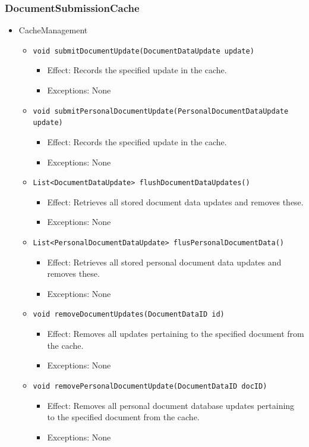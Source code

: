 \documentclass[a4paper,10pt]{article}
\begin{document}
\subsubsection*{DocumentSubmissionCache}
\begin{itemize}
	\item CacheManagement
	\begin{itemize}
		\item \texttt{void submitDocumentUpdate(DocumentDataUpdate update)}
		\begin{itemize}
			\item Effect: Records the specified update in the cache.
			\item Exceptions: None
		\end{itemize}
		
		\item \texttt{void submitPersonalDocumentUpdate(PersonalDocumentDataUpdate update)}
		\begin{itemize}
			\item Effect: Records the specified update in the cache.
			\item Exceptions: None
		\end{itemize}
		
		\item \texttt{List<DocumentDataUpdate> flushDocumentDataUpdates()}
		\begin{itemize}
			\item Effect: Retrieves all stored document data updates and removes these.
			\item Exceptions: None
		\end{itemize}
		
		\item \texttt{List<PersonalDocumentDataUpdate> flusPersonalDocumentData()}
		\begin{itemize}
			\item Effect: Retrieves all stored personal document data updates and removes these.
			\item Exceptions: None
		\end{itemize}
		
		\item \texttt{void removeDocumentUpdates(DocumentDataID id)}
		\begin{itemize}
			\item Effect: Removes all updates pertaining to the specified document from the cache.
			\item Exceptions: None
		\end{itemize}
		
		\item \texttt{void removePersonalDocumentUpdate(DocumentDataID docID)}
		\begin{itemize}
			\item Effect: Removes all personal document database updates pertaining to the specified document from the cache.
			\item Exceptions: None
		\end{itemize}
	\end{itemize}
\end{itemize}
\end{document}
